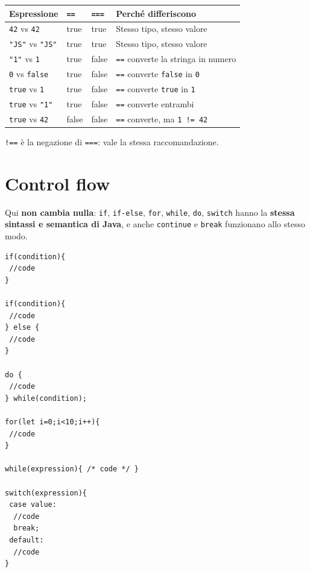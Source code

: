 \documentclass[10pt,a4paper]{article}
\begin{document}
\begin{center}
\small
\begin{tabularx}{\textwidth}{@{}lllX@{}}
\toprule
\textbf{Espressione} & \texttt{==} & \texttt{===} & \textbf{Perché differiscono} \\
\midrule
\texttt{42} vs \texttt{42} & true & true & Stesso tipo, stesso valore \\
\texttt{"JS"} vs \texttt{"JS"} & true & true & Stesso tipo, stesso valore \\
\texttt{"1"} vs \texttt{1} & true & false & \texttt{==} converte la stringa in numero \\
\texttt{0} vs \texttt{false} & true & false & \texttt{==} converte \texttt{false} in \texttt{0} \\
\texttt{true} vs \texttt{1} & true & false & \texttt{==} converte \texttt{true} in \texttt{1} \\
\texttt{true} vs \texttt{"1"} & true & false & \texttt{==} converte entrambi \\
\texttt{true} vs \texttt{42} & false & false & \texttt{==} converte, ma \texttt{1 != 42} \\
\bottomrule
\end{tabularx}
\end{center}

\texttt{!==} è la negazione di \texttt{===}: vale la stessa raccomandazione.

\section{Control flow}

Qui \textbf{non cambia nulla}: \texttt{if}, \texttt{if-else}, \texttt{for}, \texttt{while}, \texttt{do}, \texttt{switch} hanno la \textbf{stessa sintassi e semantica di Java}, e anche \texttt{continue} e \texttt{break} funzionano allo stesso modo.

\begin{lstlisting}[style=js]
if(condition){
 //code
}

if(condition){
 //code
} else {
 //code
}

do {
 //code
} while(condition);

for(let i=0;i<10;i++){
 //code
}

while(expression){ /* code */ }

switch(expression){
 case value:
  //code
  break;
 default:
  //code
}
\end{lstlisting}
\end{document}

